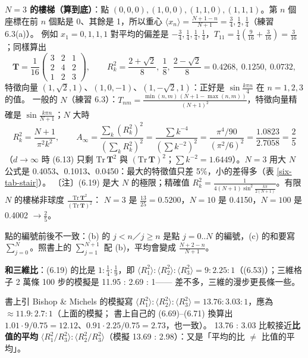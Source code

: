 \textbf{$N=3$ 的樓梯（算到底）}：點 $(0,0,0),(1,0,0),(1,1,0),(1,1,1)$。第 $n$ 個座標在前 $n$ 個點是 0、其餘是 1，所以重心 $\langle x_n\rangle=\frac{N+1-n}{N+1}=\frac34,\frac12,\frac14$（練習 6.3(a)）。
例如 $x_1=0,1,1,1$ 對平均的偏差是 $-\frac34,\frac14,\frac14,\frac14$，$T_{11}=\frac14(\frac9{16}+\frac3{16})=\frac3{16}$；同樣算出
\[\mathbf T=\frac1{16}\begin{pmatrix}3&2&1\\2&4&2\\1&2&3\end{pmatrix},\qquad R_k^2=\frac{2+\sqrt2}8,\ \frac18,\ \frac{2-\sqrt2}8=0.4268,\ 0.1250,\ 0.0732,\]
特徵向量 $(1,\sqrt2,1)$、$(1,0,-1)$、$(1,-\sqrt2,1)$：正好是 $\sin\frac{k\pi n}{4}$ 在 $n=1,2,3$ 的值。
一般的 $N$（練習 6.3）：$T_{nm}=\frac{\min(n,m)\,(N+1-\max(n,m))}{(N+1)^2}$，特徵向量精確是 $\sin\frac{k\pi n}{N+1}$；$N$ 大時
\[R_k^2=\frac{N+1}{\pi^2k^2},\qquad A_\infty=\frac{\sum_k(R_k^2)^2}{(\sum_kR_k^2)^2}=\frac{\sum k^{-4}}{(\sum k^{-2})^2}=\frac{\pi^4/90}{(\pi^2/6)^2}=\frac{1.0823}{2.7058}=\frac25\tag{6.19, 6.20}\]
（$d\to\infty$ 時 (6.13) 只剩 $\mathrm{Tr}\,\mathbf T^2$ 與 $(\mathrm{Tr}\,\mathbf T)^2$；$\sum k^{-2}=1.6449$）。$N=3$ 用大 $N$ 公式是 0.4053、0.1013、0.0450：最大的特徵值只差 5\%，小的差得多（表 \ref{six-tab-stair}）。
〔注〕(6.19) 是大 $N$ 的極限；精確值 $R_k^2=\frac{1}{4(N+1)\sin^2\frac{k\pi}{2(N+1)}}$。有限 $N$ 的樓梯非球度 $\frac{\mathrm{Tr}\,\mathbf T^2}{(\mathrm{Tr}\,\mathbf T)^2}$：
$N=3$ 是 $\frac{13}{25}=0.5200$，$N=10$ 是 0.4150，$N=100$ 是 0.4002 $\to\frac25$。
\begin{errbox}[p.~138，練習 6.3(b)(c)]
點的編號前後不一致：(b) 的 $j<n$／$j\ge n$ 是點 $j=0..N$ 的編號，(c) 的和要寫 $\sum_{j=0}^{N}$。照書上的 $\sum_{j=1}^{N+1}$ 配 (b)，平均會變成 $\frac{N+2-n}{N+1}$。
\end{errbox}

\textbf{和三維比}：(6.19) 的比是 $1:\frac14:\frac19$，即 $\langle R_1^2\rangle:\langle R_2^2\rangle:\langle R_3^2\rangle=9:2.25:1$（(6.53)）；三維格子 2 萬條 100 步的模擬是 11.95 : 2.69 : 1——
差不多，三維的漫步更長條一些。
\begin{errbox}[p.~146，(6.54)]
書上引 Bishop \& Michels 的模擬寫 $\langle R_1^2\rangle:\langle R_2^2\rangle:\langle R_3^2\rangle=13.76:3.03:1$，應為 $\approx11.9:2.7:1$（上面的模擬；
書上自己的 (6.69)--(6.71) 換算出 $1.01\cdot9/0.75=12.12$、$0.91\cdot2.25/0.75=2.73$，也一致）。
13.76 : 3.03 比較接近\textbf{比值的平均} $\langle R_1^2/R_3^2\rangle:\langle R_2^2/R_3^2\rangle$（模擬 13.69 : 2.98）：又是「平均的比 $\ne$ 比值的平均」。
\end{errbox}

